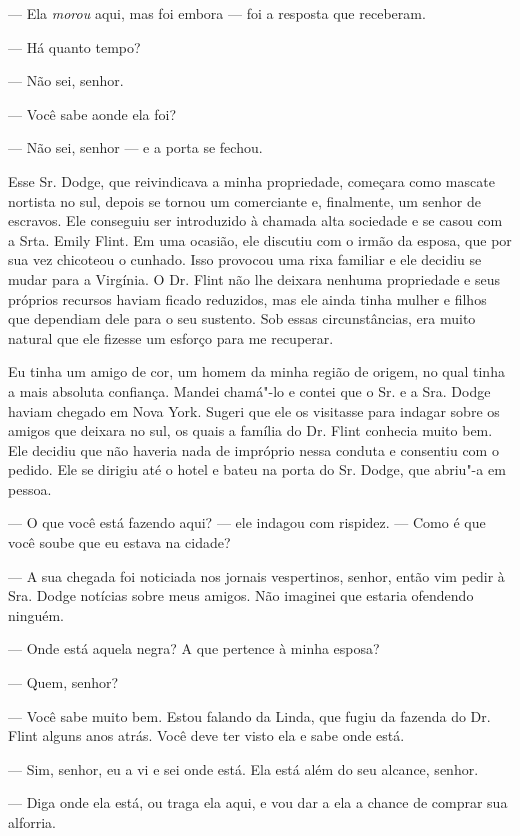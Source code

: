 --- Ela \emph{morou} aqui, mas foi
embora --- foi a resposta que receberam.

--- Há quanto tempo?

--- Não sei, senhor.

--- Você sabe aonde ela foi?

--- Não sei, senhor --- e a porta se
fechou.

Esse Sr. Dodge, que reivindicava a
minha propriedade, começara como mascate nortista no sul, depois se
tornou um comerciante e, finalmente, um senhor de escravos. Ele
conseguiu ser introduzido à chamada alta sociedade e se casou com a
Srta. Emily Flint. Em uma ocasião, ele discutiu com o irmão da esposa,
que por sua vez chicoteou o cunhado. Isso provocou uma rixa familiar e
ele decidiu se mudar para a Virgínia. O Dr. Flint não lhe deixara
nenhuma propriedade e seus próprios recursos haviam ficado reduzidos,
mas ele ainda tinha mulher e filhos que dependiam dele para o seu
sustento. Sob essas circunstâncias, era muito natural que ele fizesse um
esforço para me recuperar.

Eu tinha um amigo de cor, um homem da
minha região de origem, no qual tinha a mais absoluta confiança. Mandei
chamá"-lo e contei que o Sr. e a Sra. Dodge haviam chegado em Nova York.
Sugeri que ele os visitasse para indagar sobre os amigos que deixara no
sul, os quais a família do Dr. Flint conhecia muito bem. Ele decidiu que
não haveria nada de impróprio nessa conduta e consentiu com o pedido.
Ele se dirigiu até o hotel e bateu na porta do Sr. Dodge, que abriu"-a em
pessoa.

--- O que você está fazendo aqui? --- ele indagou com rispidez. --- Como
é que você soube que eu estava na cidade?

--- A sua chegada foi noticiada nos
jornais vespertinos, senhor, então vim pedir à Sra. Dodge notícias sobre
meus amigos. Não imaginei que estaria ofendendo ninguém.

--- Onde está aquela negra? A que
pertence à minha esposa?

--- Quem, senhor?

--- Você sabe muito bem. Estou falando
da Linda, que fugiu da fazenda do Dr. Flint alguns anos atrás. Você deve
ter visto ela e sabe onde está.

--- Sim, senhor, eu a vi e sei onde
está. Ela está além do seu alcance, senhor.

--- Diga onde ela está, ou traga ela
aqui, e vou dar a ela a chance de comprar sua alforria.

